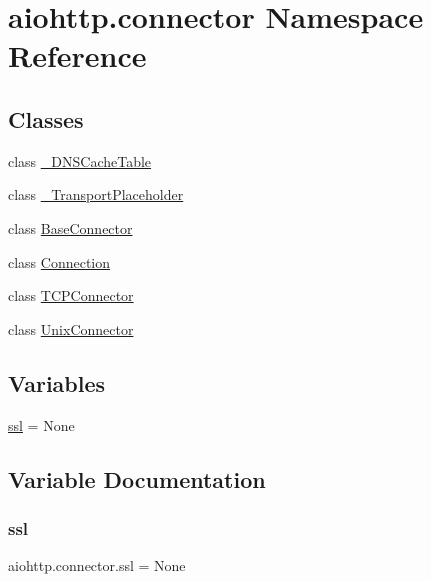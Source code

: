 \hypertarget{namespaceaiohttp_1_1connector}{}\section{aiohttp.\+connector Namespace Reference}
\label{namespaceaiohttp_1_1connector}
\subsection*{Classes}
\begin{DoxyCompactItemize}
\item 
class \hyperlink{classaiohttp_1_1connector_1_1___d_n_s_cache_table}{\+\_\+\+D\+N\+S\+Cache\+Table}
\item 
class \hyperlink{classaiohttp_1_1connector_1_1___transport_placeholder}{\+\_\+\+Transport\+Placeholder}
\item 
class \hyperlink{classaiohttp_1_1connector_1_1_base_connector}{Base\+Connector}
\item 
class \hyperlink{classaiohttp_1_1connector_1_1_connection}{Connection}
\item 
class \hyperlink{classaiohttp_1_1connector_1_1_t_c_p_connector}{T\+C\+P\+Connector}
\item 
class \hyperlink{classaiohttp_1_1connector_1_1_unix_connector}{Unix\+Connector}
\end{DoxyCompactItemize}
\subsection*{Variables}
\begin{DoxyCompactItemize}
\item 
\hyperlink{namespaceaiohttp_1_1connector_a3dc645f44b7bc9eaebb2a39ec23c728a}{ssl} = None
\end{DoxyCompactItemize}


\subsection{Variable Documentation}
\mbox{\label{namespaceaiohttp_1_1connector_a3dc645f44b7bc9eaebb2a39ec23c728a}} 
\subsubsection{\texorpdfstring{ssl}{ssl}}
{\footnotesize\ttfamily aiohttp.\+connector.\+ssl = None}

